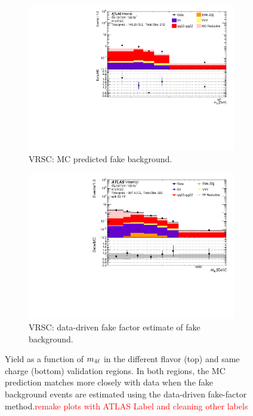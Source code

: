 \begin{figure}[htb]
\begin{subfigure}{.48\textwidth}
        \includegraphics[width = 0.9\linewidth]{figures/Analysis/Background/Overlay_VRSC_MC_M4l.pdf}
        \caption{VRSC: MC predicted fake background.\label{subfig:VRSCMCRed}}
    \end{subfigure}
    \begin{subfigure}{.48\textwidth}
        \centering
        \includegraphics[width = 0.9\linewidth]{figures/Analysis/Background/Overlay_VRSC_FFApplied_M4l.pdf}
        \caption{VRSC: data-driven fake factor estimate of fake background.\label{subfig:VRSCFF}}
    \end{subfigure}
    
    \caption{ Yield as a function of $m_{4\ell}$ in the different flavor (top) and same charge (bottom) validation regions. In both regions, the MC prediction matches more closely with data when the fake background events are estimated using the data-driven fake-factor method.\textcolor{red}{remake plots with ATLAS Label and cleaning other labels} \label{fig:VRDataMCYield}}
\end{figure}

